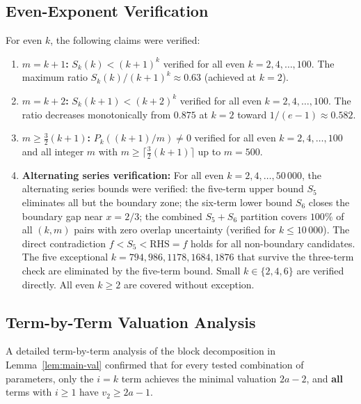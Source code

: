 \documentclass[12pt,a4paper]{article}
\theoremstyle{plain}
\theoremstyle{definition}
\begin{document}
\subsection{Even-Exponent Verification}

For even $k$, the following claims were verified:

\begin{enumerate}[label=(\arabic*), nosep]
  \item \textbf{$m = k+1$:} $S_k(k) < (k+1)^k$ verified for all even
    $k = 2, 4, \dots, 100$.  The maximum ratio
    $S_k(k)/(k+1)^k \approx 0.63$ (achieved at $k=2$).
  \item \textbf{$m = k+2$:} $S_k(k+1) < (k+2)^k$ verified for all even
    $k = 2, 4, \dots, 100$.  The ratio decreases monotonically from
    $0.875$ at $k=2$ toward $1/(e-1) \approx 0.582$.
  \item \textbf{$m \ge \frac{3}{2}(k+1)$:} $P_k((k+1)/m) \neq 0$ verified
    for all even $k = 2, 4, \dots, 100$ and all integer $m$ with
    $m \ge \lceil\frac{3}{2}(k+1)\rceil$ up to $m = 500$.
  \item \textbf{Alternating series verification:} For all even $k = 2, 4,
    \dots, 50\,000$, the alternating series bounds were verified:
    the five-term upper bound $S_5$ eliminates all but the boundary zone;
    the six-term lower bound $S_6$ closes the boundary gap near $x = 2/3$;
    the combined $S_5 + S_6$ partition covers $100\%$ of all $(k,m)$ pairs
    with zero overlap uncertainty (verified for $k \le 10\,000$).
    The direct contradiction $f < S_5 < \mathrm{RHS} = f$ holds for all
    non-boundary candidates.
    The five exceptional $k = 794, 986, 1178, 1684, 1876$ that survive the
    three-term check are eliminated by the five-term bound.
    Small $k \in \{2, 4, 6\}$ are verified directly.
    All even $k \ge 2$ are covered without exception.
\end{enumerate}

\subsection{Term-by-Term Valuation Analysis}

A detailed term-by-term analysis of the block decomposition in
Lemma~\ref{lem:main-val} confirmed that for every tested combination of
parameters, only the $i=k$ term achieves the minimal valuation $2a-2$,
and \textbf{all} terms with $i \ge 1$ have $v_2 \ge 2a-1$.
\end{document}
